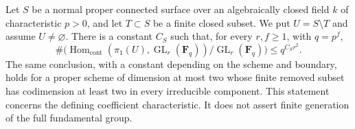 \begin{theorem}
\label{D:global-quadratic-representation-bound}
Let $S$ be a normal proper connected surface over an algebraically closed
field $k$ of characteristic $p>0$, and let $T\subset S$ be a finite closed
subset. We put $U=S\setminus T$ and assume $U\ne\varnothing$. There is
a constant $C_S$ such that, for every $r,f\ge1$, with $q=p^f$,
\[
 \#\bigl(\operatorname{Hom}_{\mathrm{cont}}
   (\pi_1(U),\operatorname{GL}_r(\mathbf F_q))/
   \operatorname{GL}_r(\mathbf F_q)\bigr)
 \le q^{C_Sr^2}.
\]
The same conclusion, with a constant depending on the scheme and boundary,
holds for a proper scheme of dimension at most two whose finite removed
subset has codimension at least two in every irreducible component.
This statement concerns the defining coefficient characteristic. It does
not assert finite generation of the full fundamental group.
\end{theorem}
